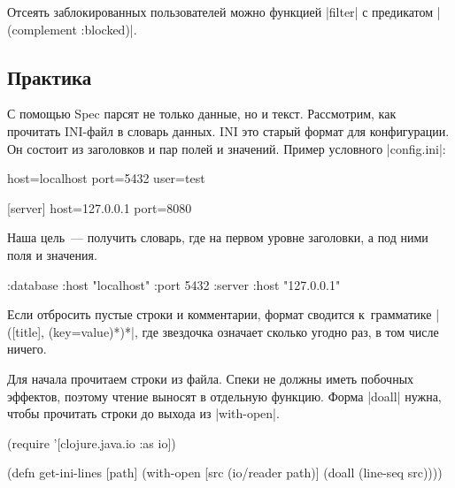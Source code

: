 
Отсеять заблокированных пользователей можно функцией \spverb|filter| с
предикатом \spverb|(complement :blocked)|.

\subsection{Практика}


С помощью Spec парсят не только данные, но и текст. Рассмотрим, как прочитать
INI-файл в словарь данных. INI
это старый формат для конфигурации. Он состоит из заголовков и пар полей и
значений. Пример условного \spverb|config.ini|:

\begin{english}
  \begin{ini}
[database]
host=localhost
port=5432
user=test

[server]
host=127.0.0.1
port=8080
  \end{ini}
\end{english}

Наша цель~--- получить словарь, где на первом уровне заголовки, а под ними поля
и значения.

\begin{english}
  \begin{clojure}
{:database {:host "localhost"
            :port 5432}
 :server {:host "127.0.0.1"}}
  \end{clojure}
\end{english}

Если отбросить пустые строки и комментарии, формат сводится к~грамматике
\spverb|([title], (key=value)*)*|, где звездочка означает сколько угодно раз, в
том числе ничего.


Для начала прочитаем строки из файла. Спеки не должны иметь побочных эффектов,
поэтому чтение выносят в отдельную функцию. Форма \spverb|doall| нужна, чтобы
прочитать строки до выхода из \spverb|with-open|.



\begin{english}
  \begin{clojure}
(require '[clojure.java.io :as io])

(defn get-ini-lines [path]
  (with-open [src (io/reader path)]
    (doall (line-seq src))))
  \end{clojure}
\end{english}

